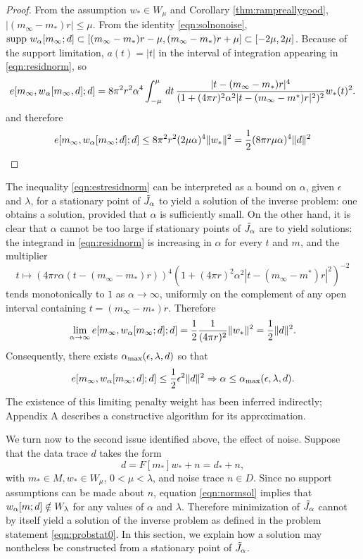 \begin{proof}
  From the assumption $w_* \in W_{\mu}$ and Corollary
  \ref{thm:rampreallygood}, $|(m_{\infty}-m_*)r|\le \mu$. From the
  identity \ref{eqn:solnonoise},
  $\mbox{supp }w_{\alpha}[m_{\infty};d] \subset
  [(m_{\infty}-m_*)r-\mu,(m_{\infty}-m_*)r+\mu] \subset
  [-2\mu,2\mu]$. Because of the support limitation, $a(t)=|t|$ in the
  interval of integration appearing in \ref{eqn:residnorm}, so
\[
  e[m_{\infty},w_{\alpha}[m_{\infty},d];d] 
= 8 \pi^2 r^2 \alpha^4\int^{\mu}_{-\mu}\,dt\,\frac{|t-(m_{\infty}-m_*)r|^4}{(1+(4\pi r)^2 \alpha^2 
|t-(m_{\infty}-m^*)r|^2)^{2}}w_*(t)^2.
\]
and therefore
\begin{equation}
  \label{eqn:estresidnorm}
e[m_{\infty},w_{\alpha}[m_{\infty};d];d] \le 8 \pi^2 r^2 (2\mu\alpha)^4 \|w_*\|^2 =
\frac{1}{2}(8 \pi r \mu \alpha)^4 \|d\|^2
\end{equation}
\end{proof}

The inequality \ref{eqn:estresidnorm} can be interpreted as a bound 
on $\alpha$, given $\epsilon$ and $\lambda$, for a
stationary point of $\tilde{J}_{\alpha}$ to yield a solution of the inverse
problem: one obtains a solution, provided that $\alpha$ is
sufficiently small. On the other hand, it is clear that $\alpha$
cannot be too large if stationary points of $\tilde{J}_{\alpha}$ are to yield
solutions: the integrand in \ref{eqn:residnorm} is increasing in
$\alpha$ for every $t$ and $m$, and the multiplier
\[
t \mapsto (4\pi r \alpha(t-(m_{\infty}-m_*)r))^4(1+(4\pi r)^2 \alpha^2 
|t-(m_{\infty}-m^*)r|^2)^{-2}
\]
tends monotonically to $1$ as $\alpha \rightarrow \infty$, uniformly
on the complement of any open interval containing
$t=(m_{\infty}-m_*)r$. Therefore
\begin{equation}
  \label{eqn:elimit}
  \lim_{\alpha \rightarrow \infty}e[m_{\infty},w_{\alpha}[m_{\infty};d];d] =
  \frac{1}{2}\frac{1}{(4 \pi r)^2}\|w_*\|^2 = \frac{1}{2}\|d\|^2.
\end{equation}
Consequently, there exists $\alpha_{\rm max}(\epsilon,\lambda,d)$ so
that
\[
  e[m_{\infty},w_{\alpha}[m_{\infty};d];d]  \le \frac{1}{2}\epsilon^2\|d\|^2
  \Rightarrow \alpha \le \alpha_{\rm max}(\epsilon,\lambda,d).
\]
The existence of this limiting penalty weight has been inferred
indirectly; Appendix A describes a constructive algorithm
for its approximation.

We turn now to the second issue identified above, the effect of
noise. Suppose that the data trace $d$ takes the form
\begin{equation}
  \label{eqn:defdatanoisy}
  d = F[m_*]w_* + n = d_*+n,
\end{equation}
with $m_* \in M, w_* \in W_{\mu}$, $0<\mu<\lambda$, and noise trace $n \in
D$. Since no support assumptions can be made about $n$, equation
\ref{eqn:normsol} implies that $w_{\alpha}[m;d] \notin W_{\lambda}$ for any values of
$\alpha$ and $\lambda$.  Therefore minimization of $\tilde{J}_{\alpha}$ cannot by itself yield a
solution of the inverse problem as defined in the problem statement
\ref{eqn:probstat0}. In this section, we explain how a solution may
nontheless be constructed from a stationary point of $\tilde{J}_{\alpha}$.


